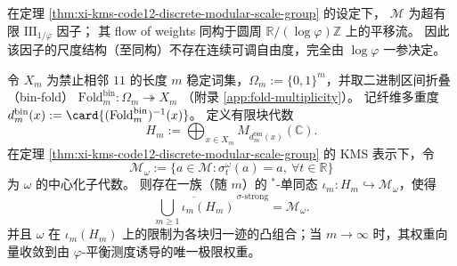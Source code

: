\begin{corollary}\label{cor:xi-kms-code12-type-rigidity}
在定理 \ref{thm:xi-kms-code12-discrete-modular-scale-group} 的设定下，
\(\mathcal M\) 为超有限 \(\mathrm{III}_{1/\varphi}\) 因子；
其 flow of weights 同构于圆周 \(\mathbb R/(\log\varphi)\mathbb Z\) 上的平移流。
因此该因子的尺度结构（至同构）不存在连续可调自由度，完全由 \(\log\varphi\) 一参决定。
\end{corollary}

\begin{proposition}\label{prop:xi-fold-microblock-centralizer-strong-density}
令 \(X_m\) 为禁止相邻 \(11\) 的长度 \(m\) 稳定词集，\(\Omega_m:=\{0,1\}^m\)，并取二进制区间折叠（bin-fold）
\(
\mathrm{Fold}^{\mathrm{bin}}_m:\Omega_m\twoheadrightarrow X_m
\)
（附录 \ref{app:fold-multiplicity}）。
记纤维多重度 \(d_m^{\mathrm{bin}}(x):=\card{(\mathrm{Fold}^{\mathrm{bin}}_m)^{-1}(x)}\)。
定义有限块代数
\[
H_m:=\bigoplus_{x\in X_m} M_{d_m^{\mathrm{bin}}(x)}(\mathbb C).
\]
在定理 \ref{thm:xi-kms-code12-discrete-modular-scale-group} 的 KMS 表示下，令
\[
\mathcal M_\omega:=\{a\in\mathcal M:\sigma_t^\omega(a)=a,\ \forall t\in\mathbb R\}
\]
为 \(\omega\) 的中心化子代数。
则存在一族（随 \(m\)）的 \(^\ast\)-单同态 \(\iota_m:H_m\hookrightarrow \mathcal M_\omega\)，使得
\[
\overline{\bigcup_{m\ge 1}\iota_m(H_m)}^{\ \sigma\text{-strong}}=\mathcal M_\omega.
\]
并且 \(\omega\) 在 \(\iota_m(H_m)\) 上的限制为各块归一迹的凸组合；当 \(m\to\infty\) 时，其权重向量收敛到由 \(\varphi\)-平衡测度诱导的唯一极限权重。
\end{proposition}

